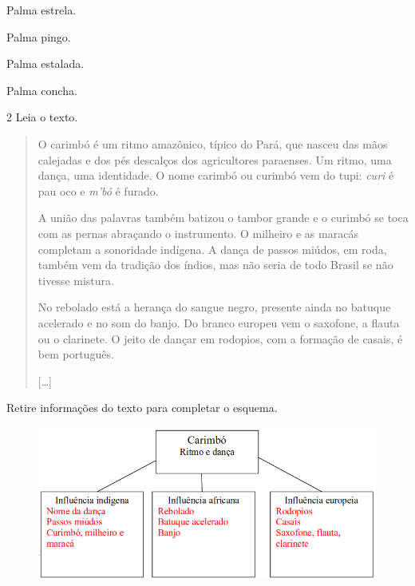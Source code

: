 \begin{minipage}{.5\textwidth}
\begin{boxlist}
 Palma estrela.

 Palma pingo.

 Palma estalada.

 Palma concha.
\end{boxlist}
\end{minipage}

\num{2}  Leia o texto.

\begin{quote}
O carimbó é um ritmo amazônico, típico do Pará, que nasceu das mãos
calejadas e dos pés descalços dos agricultores paraenses. Um ritmo, uma
dança, uma identidade. O nome carimbó ou curimbó vem do tupi:
\emph{curi} é pau oco e \emph{m'bó} é furado.

A união das palavras também batizou o tambor grande e o curimbó se toca
com as pernas abraçando o instrumento. O milheiro e as maracás completam
a sonoridade indígena. A dança de passos miúdos, em roda, também vem da
tradição dos índios, mas não seria de todo Brasil se não tivesse
mistura.

No rebolado está a herança do sangue negro, presente ainda no batuque
acelerado e no som do banjo. Do branco europeu vem o saxofone, a flauta
ou o clarinete. O jeito de dançar em rodopios, com a formação de casais,
é bem português.

{[}\ldots{}{]}

\end{quote}

Retire informações do texto para completar o esquema.

\begin{figure}[htpb!]
\includegraphics[width=\textwidth]{./imgs/art3.png}
\end{figure}

